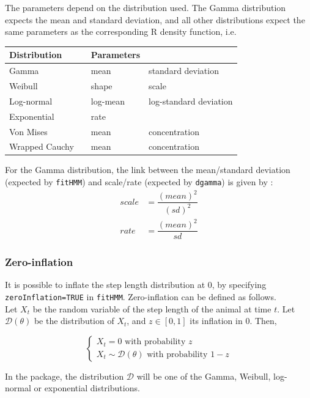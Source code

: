 \documentclass[]{article}
\begin{document}
The parameters depend on the distribution used. The Gamma distribution expects the mean and standard deviation, and all other distributions expect the same parameters as the corresponding R density function, i.e.
\begin{center}
\begin{tabular}{lcll}
	Distribution & & Parameters & \\
	\hline
	Gamma & & mean & standard deviation\\
	Weibull & & shape & scale\\
	Log-normal & & log-mean & log-standard deviation\\
	Exponential & & rate & \\
	\hline
	Von Mises & & mean & concentration\\
	Wrapped Cauchy & & mean & concentration\\
	\hline	
\end{tabular}
\end{center}

For the Gamma distribution, the link between the mean/standard deviation (expected by \texttt{fitHMM}) and scale/rate (expected by \texttt{dgamma}) is given by :
\begin{align*}
	scale & = \dfrac{(mean)^2}{(sd)^2}\\
	rate & = \dfrac{(mean)^2}{sd}
\end{align*}

\subsubsection{Zero-inflation}
It is possible to inflate the step length distribution at $0$, by specifying \texttt{zeroInflation=TRUE} in \texttt{fitHMM}. Zero-inflation can be defined as follows.\\

Let $X_t$ be the random variable of the step length of the animal at time $t$. Let $\mathcal{D}(\theta)$ be the distribution of $X_t$, and $z \in [0,1]$ its inflation in $0$. Then,

\begin{equation*}
	\begin{cases}
		X_t = 0 \text{ with probability $z$}\\
		X_t \sim \mathcal{D}(\theta) \text{ with probability $1-z$}
	\end{cases}
\end{equation*}

In the package, the distribution $\mathcal{D}$ will be one of the Gamma, Weibull, log-normal or exponential distributions.
\end{document}
